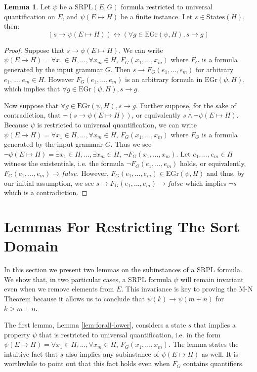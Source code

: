 \documentclass[12pt]{article}
\theoremstyle{definition}
\newtheorem{lemma}{Lemma}
\theoremstyle{remark}
\newcommand{\states}{\text{States}}
\newcommand{\gr}{\text{EGr}}
\newcommand{\SRPL}{\text{SRPL}}
\begin{document}
\begin{lemma}
  \label{lem:pnf-ground}
  Let $\psi$ be a $\SRPL(E,G)$ formula restricted to universal quantification on $E$, and $\psi(E \mapsto H)$ be a finite instance.  Let $s \in \states(H)$, then:
  $$(s \rightarrow \psi(E \mapsto H)) \leftrightarrow (\forall g \in \gr(\psi,H), s \rightarrow g)$$
\end{lemma}
\begin{proof}
  Suppose that $s \rightarrow \psi(E \mapsto H)$.  We can write $\psi(E \mapsto H) = \forall x_1 \in H,...,\forall x_m \in H, \, F_G(x_1,...,x_m)$ where $F_G$ is a formula generated by the input grammar $G$.  Then $s \rightarrow F_G(e_1,...,e_m)$ for arbitrary $e_1,...,e_m \in H$.  However $F_G(e_1,...,e_m)$ is an arbitrary formula in $\gr(\psi,H)$, which implies that $\forall g \in \gr(\psi,H), s \rightarrow g$.

  Now suppose that $\forall g \in \gr(\psi,H), s \rightarrow g$.  Further suppose, for the sake of contradiction, that $\neg(s \rightarrow \psi(E \mapsto H))$, or equivalently $s \land \neg\psi(E \mapsto H)$.  Because $\psi$ is restricted to universal quantification, we can write $\psi(E \mapsto H) = \forall x_1 \in H,...,\forall x_m \in H, \, F_G(x_1,...,x_m)$ where $F_G$ is a formula generated by the input grammar $G$.  Thus we see $\neg\psi(E \mapsto H) = \exists x_1 \in H,...,\exists x_m \in H, \, \neg F_G(x_1,...,x_m)$.  Let $e_1,...,e_m \in H$ witness the existentials, i.e. the formula $\neg F_G(e_1,...,e_m)$ holds, or equivalently, $F_G(e_1,...,e_m) \rightarrow false$.  However, $F_G(e_1,...,e_m) \in \gr(\psi,H)$ and thus, by our initial assumption, we see $s \rightarrow F_G(e_1,...,e_m) \rightarrow false$ which implies $\neg s$ which is a contradiction.
\end{proof}



\section{Lemmas For Restricting The Sort Domain}

In this section we present two lemmas on the subinstances of a SRPL formula.  We show that, in two particular cases, a SRPL formula $\psi$ will remain invariant even when we remove elements from $E$.  This invariance is key to proving the M-N Theorem because it allows us to conclude that $\psi(k) \rightarrow \psi(m+n)$ for $k>m+n$.

The first lemma, Lemma \ref{lem:forall-lower}, considers a state $s$ that implies a property $\psi$ that is restricted to universal quantification, i.e. in the form $\psi(E \mapsto H) = \forall x_1 \in H,...,\forall x_m \in H, \, F_G(x_1,...,x_m)$.  The lemma states the intuitive fact that $s$ also implies any subinstance of $\psi(E \mapsto H)$ as well.  It is worthwhile to point out that this fact holds even when $F_G$ contains quantifiers.
\end{document}
